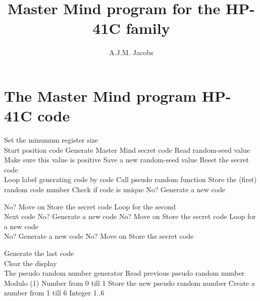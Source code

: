\documentclass[a4paper, landscape]{article}
\author{A.J.M. Jacobs}
\title{Master Mind program for the HP-41C family}
\begin{document}
\maketitle
\tableofcontents

\clearpage
\section{The Master Mind program HP-41C code}

\tStarttabular
{}
      {Set the minumum register size}
\\
     {Start position code Generate Master Mind secret code}  
       {Read random-seed value}  
       {}  
    {Make sure this value is positive}   
       {Save a new random-seed value} 
        {} 
       {Reset the secret code} 
       {} 
       {} 
\\
       {Loop label generating code by code} 
       {Call pseudo random function} 
       {Store the (first) random code number} 
       {Check if code is unique} 
\tXeqYfo           {} 
       {No? Generate a new code } 

\tNewPage

       {No? Move on} 
       {} 
       {Store the secret code} 
       {Loop for the second} 
\\
       {Next code} 
       {} 
       {} 
       {No? Generate a new code} 
       {No? Move on} 
       {} 
       {Store the secret code} 
       {Loop for a new code} 
\\
       {}
       {} 
       {} 
       {No? Generate a new code} 
       {No? Move on} 
       {} 
       {Store the secret code} 

\tNewPage

       {Generate the last code} 
\\
       {} 
        {Clear the display} 
\\
       {The pseudo random number generator} 
       {Read previous pseudo random number} 
        {} 
\tOPmultiplyfo     {} 
        {} 
    {Modulo (1)  Number from 0 till 1} 
       {Store the new pseudo random number} 
        {Create a number from 1 till 6} 
\tOPmultiplyfo     {} 
        {} 
\tOPplusfo         {} 
    {Integer 1..6} 
\end{document}
